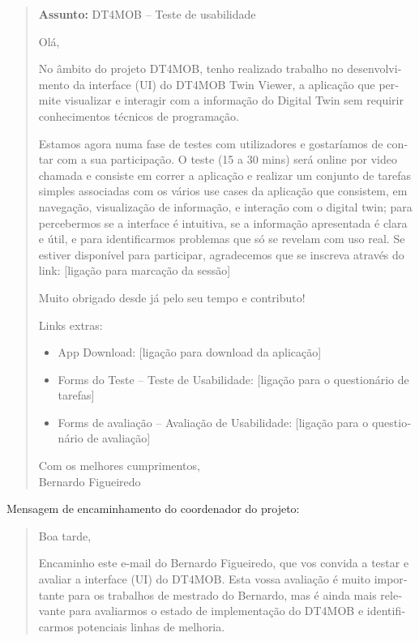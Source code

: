 \begin{otherlanguage}{portuguese}
\begin{quote}
\small
\textbf{Assunto:} DT4MOB -- Teste de usabilidade

Olá,

No âmbito do projeto DT4MOB, tenho realizado trabalho no desenvolvimento da interface (UI) do DT4MOB Twin Viewer, a aplicação que permite visualizar e interagir com a informação do Digital Twin sem requirir conhecimentos técnicos de programação.

Estamos agora numa fase de testes com utilizadores e gostaríamos de contar com a sua participação. O teste (15 a 30 mins) será online por video chamada e consiste em correr a aplicação e realizar um conjunto de tarefas simples associadas com os vários use cases da aplicação que consistem, em navegação, visualização de informação, e interação com o digital twin; para percebermos se a interface é intuitiva, se a informação apresentada é clara e útil, e para identificarmos problemas que só se revelam com uso real. Se estiver disponível para participar, agradecemos que se inscreva através do link: [ligação para marcação da sessão]

Muito obrigado desde já pelo seu tempo e contributo!

Links extras:
\begin{itemize}
    \item App Download: [ligação para download da aplicação]
    \item Forms do Teste -- Teste de Usabilidade: [ligação para o questionário de tarefas]
    \item Forms de avaliação -- Avaliação de Usabilidade: [ligação para o questionário de avaliação]
\end{itemize}

Com os melhores cumprimentos,\\
Bernardo Figueiredo
\end{quote}

\noindent Mensagem de encaminhamento do coordenador do projeto:

\begin{quote}
\small
Boa tarde,

Encaminho este e-mail do Bernardo Figueiredo, que vos convida a testar e avaliar a interface (UI) do DT4MOB. Esta vossa avaliação é muito importante para os trabalhos de mestrado do Bernardo, mas é ainda mais relevante para avaliarmos o estado de implementação do DT4MOB e identificarmos potenciais linhas de melhoria.


\end{quote}
\end{otherlanguage}
